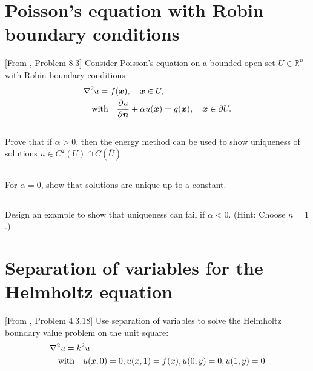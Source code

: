 \documentclass[11pt,letterpaper]{report}
\begin{document}
\section{Poisson’s equation with Robin boundary conditions}
[From \cite{ShearerLevy_15}, Problem 8.3]
Consider Poisson’s equation on a bounded open set $U \in\mathbb{R}^n$ with Robin boundary conditions
\begin{align}
    &\nabla^2 u = f(\boldsymbol{x}),\quad\boldsymbol{x}\in U,\\
    &\quad \mbox{with} \quad \frac{\partial u}{\partial\boldsymbol{n}}+\alpha u(\boldsymbol{x}) = g(\boldsymbol{x}),\quad\boldsymbol{x}\in\partial U.
\end{align}

\subsection{}
Prove that if $\alpha > 0$, then the energy method can be used to show
uniqueness of solutions $u\in C^2(U)\cap C(\overline{U})$

\subsection{}
For $\alpha = 0$, show that solutions are unique up to a constant.

\subsection{}
Design an example to show that uniqueness can fail if $\alpha < 0$. (Hint: Choose $n = 1$.)

\section{Separation of variables for the Helmholtz equation}
[From \cite{Olver_14}, Problem 4.3.18] Use separation of variables to solve the Helmholtz boundary value problem on the unit square:
\begin{align}
    &\nabla^2 u = k^2u\\
    &\quad \mbox{with} \quad u(x,0)=0, u(x,1)=f(x), u(0, y) = 0, u(1, y) = 0
\end{align}
\end{document}
